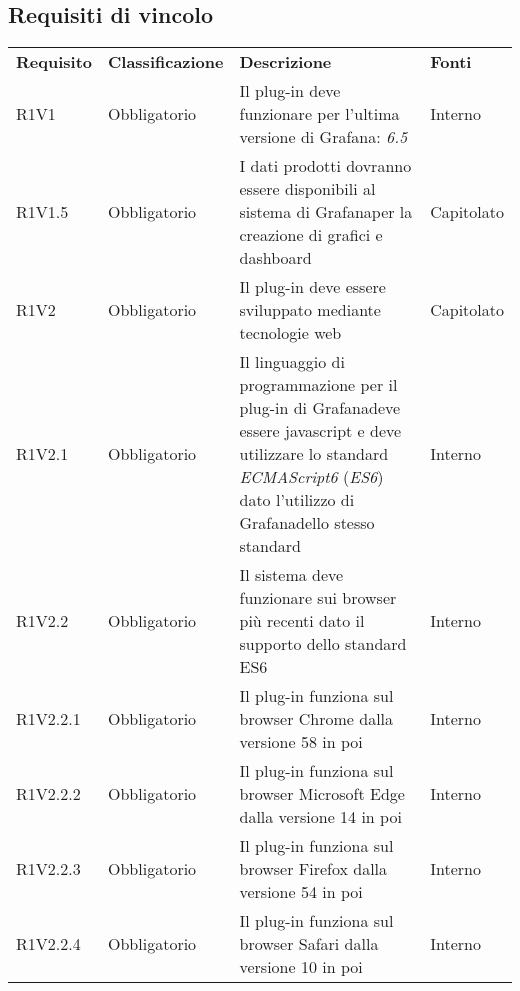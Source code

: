 \subsection{Requisiti di vincolo}
	\begin{longtable} {
		>{\centering}p{18mm} 
		>{\centering}p{28mm}
		>{}p{50mm} 
		>{}p{28mm}
		}
	\rowcolor{gray!50}
	\textbf{Requisito} & 
	\textbf{Classificazione} & 
	\textbf{Descrizione} & 
	\textbf{Fonti} 	\TBstrut \\
	
	R1V1 & 
	Obbligatorio & 
	Il plug-in deve funzionare per l'ultima versione di Grafana\glo: \textit{6.5} &
	Interno  \TBstrut \\ [2mm]		
	
	R1V1.5 &
	Obbligatorio &
	I dati prodotti dovranno essere disponibili al sistema di Grafana\glosp per la creazione di grafici e dashboard\glo  &
	Capitolato  \TBstrut \\ [2mm]

	R1V2 & 
	Obbligatorio & 
	Il plug-in deve essere sviluppato mediante tecnologie web &
	Capitolato  \TBstrut \\ [2mm]
	
	R1V2.1 & 
	Obbligatorio & 
	Il linguaggio di programmazione per il plug-in di Grafana\glosp deve essere javascript e deve utilizzare lo standard \textit{ECMAScript6} (\textit{ES6}) dato l'utilizzo di Grafana\glosp dello stesso standard &
	Interno  \TBstrut \\ [2mm]
	
	R1V2.2 & 
	Obbligatorio & 
	Il sistema deve funzionare sui browser più recenti dato il supporto dello standard ES6 &
	Interno  \TBstrut \\ [2mm]
	
	R1V2.2.1 & 
	Obbligatorio & 
	Il plug-in funziona sul browser Chrome dalla versione 58 in poi &
	Interno  \TBstrut \\ [2mm]
	
	R1V2.2.2 & 
	Obbligatorio & 
	Il plug-in funziona sul browser Microsoft Edge dalla versione 14 in poi &
	Interno  \TBstrut \\ [2mm]
	
	R1V2.2.3 & 
	Obbligatorio & 
	Il plug-in funziona sul browser Firefox dalla versione 54 in poi &
	Interno  \TBstrut \\ [2mm]
	
	R1V2.2.4 & 
	Obbligatorio & 
	Il plug-in funziona sul browser Safari dalla versione 10 in poi &
	Interno  \TBstrut \\ [2mm]
	

\end{longtable}
